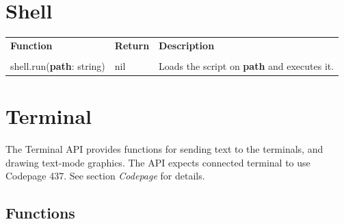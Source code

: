 \documentclass[10pt, stock]{memoir}
\let\oldsection\section
\renewcommand\section{\clearpage\oldsection}
\begin{document}
\section{Shell}



\begin{tabularx}{\textwidth}{l l X}
	\textbf{\large Function} & \textbf{\large Return} & \textbf{\large Description}
	\\ \\
	\endhead
	shell.run(\textbf{path}: string) & nil & Loads the script on \textbf{path} and executes it.
\end{tabularx}

\section{Terminal}

The Terminal API provides functions for sending text to the terminals, and drawing text-mode graphics. The API expects connected terminal to use Codepage 437. See section \emph{Codepage} for details.

\subsection{Functions}
\end{document}
